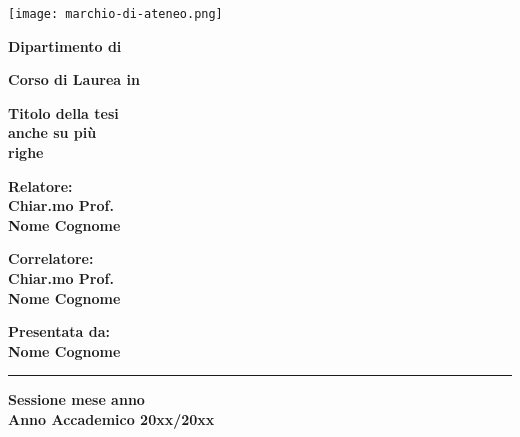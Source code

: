 
\begin{titlepage}
    
\pagestyle{empty}


\begin{center}

\texttt{[image: marchio-di-ateneo.png]}

\vspace{10mm}

{\large{\bf{Dipartimento di }}} 

\vspace{5mm}

{\Large{\bf{Corso di Laurea in }}}

\vspace{15mm}

{\Huge{\bf Titolo della tesi }}\\
\vspace{3mm}
{\Huge{\bf anche su più}}\\
\vspace{3mm}
{\Huge{\bf righe }}\\
\vspace{3mm}

\end{center}

\vspace{10mm}

\begin{minipage}[t]{0.40\textwidth}
{\Large{\bf Relatore: \\ Chiar.mo Prof.\\ Nome Cognome}}

\vspace{3mm}

{\Large{\bf Correlatore: \\ Chiar.mo Prof.\\ Nome Cognome}}
\end{minipage}
\hfill
\begin{minipage}[t]{0.40\textwidth}\raggedleft
{\Large{\bf Presentata da: \\ Nome Cognome}}
\end{minipage}

\vspace{30mm}

\rule[0.5cm]{15.8cm}{0.6mm}

\begin{center}
{\large{\bf Sessione mese anno \\}}
{\large{\bf Anno Accademico 20xx/20xx\\}}
\end{center}

\end{titlepage}

\restoregeometry
\newpage
